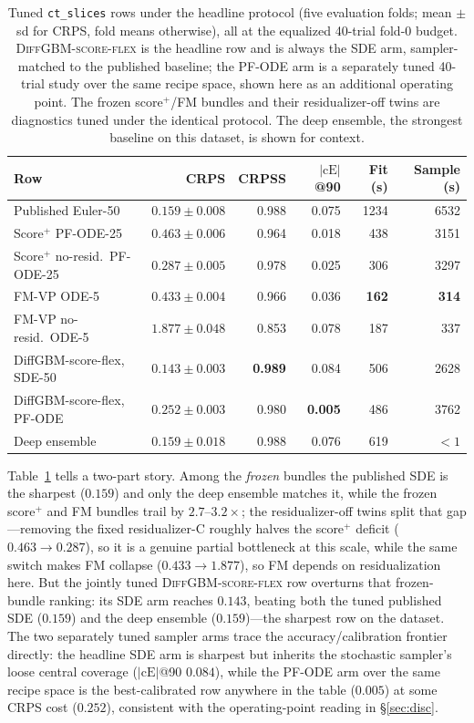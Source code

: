 \documentclass{article}
\begin{document}
\begin{table}[!h]
  \centering
  \caption{Tuned \texttt{ct\_slices} rows under the headline protocol (five evaluation folds; mean $\pm$ sd for CRPS, fold means otherwise), all at the equalized 40-trial fold-0 budget. \textsc{DiffGBM-score-flex} is the headline row and is always the SDE arm, sampler-matched to the published baseline; the PF-ODE arm is a separately tuned 40-trial study over the same recipe space, shown here as an additional operating point. The frozen score$^+$/FM bundles and their residualizer-off twins are diagnostics tuned under the identical protocol. The deep ensemble, the strongest baseline on this dataset, is shown for context.}\label{tab:ct-slices-tuned}
  \scriptsize
  \begin{tabular}{lrrrrr}
    \toprule
    Row & CRPS & CRPSS & $|\text{cE}|$@90 & Fit (s) & Sample (s) \\
    \midrule
    Published Euler-50           & $0.159 \pm 0.008$ & 0.988 & 0.075 & 1234 & 6532 \\
    Score$^+$ PF-ODE-25          & $0.463 \pm 0.006$ & 0.964 & 0.018 & 438 & 3151 \\
    Score$^+$ no-resid.\ PF-ODE-25 & $0.287 \pm 0.005$ & 0.978 & 0.025 & 306 & 3297 \\
    FM-VP ODE-5                  & $0.433 \pm 0.004$ & 0.966 & 0.036 & \textbf{162} & \textbf{314} \\
    FM-VP no-resid.\ ODE-5       & $1.877 \pm 0.048$ & 0.853 & 0.078 & 187 & 337 \\
    DiffGBM-score-flex, SDE-50   & $\mathbf{0.143 \pm 0.003}$ & \textbf{0.989} & 0.084 & 506 & 2628 \\
    DiffGBM-score-flex, PF-ODE   & $0.252 \pm 0.003$ & 0.980 & \textbf{0.005} & 486 & 3762 \\
    Deep ensemble                & $0.159 \pm 0.018$ & 0.988 & 0.076 & 619 & $<1$ \\
    \bottomrule
  \end{tabular}
\end{table}

Table~\ref{tab:ct-slices-tuned} tells a two-part story. Among the \emph{frozen} bundles the published SDE is the sharpest ($0.159$) and only the deep ensemble matches it, while the frozen score$^+$ and FM bundles trail by $2.7$--$3.2\times$; the residualizer-off twins split that gap---removing the fixed residualizer-C roughly halves the score$^+$ deficit ($0.463 \to 0.287$), so it is a genuine partial bottleneck at this scale, while the same switch makes FM collapse ($0.433 \to 1.877$), so FM depends on residualization here. But the jointly tuned \textsc{DiffGBM-score-flex} row overturns that frozen-bundle ranking: its SDE arm reaches $0.143$, beating both the tuned published SDE ($0.159$) and the deep ensemble ($0.159$)---the sharpest row on the dataset. The two separately tuned sampler arms trace the accuracy/calibration frontier directly: the headline SDE arm is sharpest but inherits the stochastic sampler's loose central coverage ($|\text{cE}|$@90 $0.084$), while the PF-ODE arm over the same recipe space is the best-calibrated row anywhere in the table ($0.005$) at some CRPS cost ($0.252$), consistent with the operating-point reading in \S\ref{sec:disc}.
\end{document}
